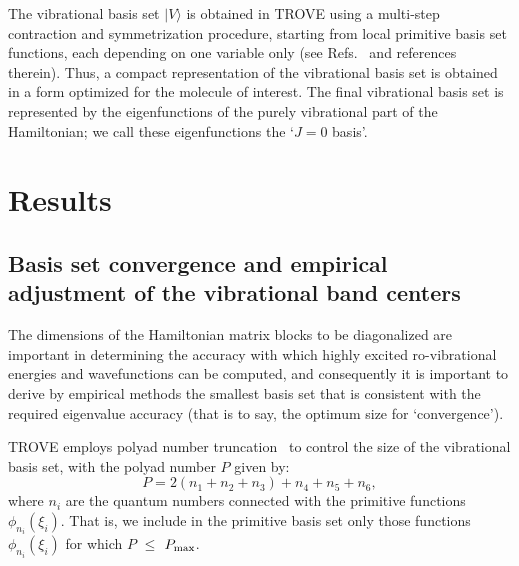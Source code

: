 \documentclass{achemso}
\newcommand{\3}{$_{3}$}
\begin{document}
The vibrational basis set $|V\rangle$ is obtained in TROVE using a multi-step contraction and symmetrization procedure, starting from local primitive basis set functions, each depending on one variable only (see Refs.~ and references therein).
Thus, a compact representation of the vibrational basis set is obtained in a form
 optimized for the molecule of interest.
 The final vibrational basis set is represented by the eigenfunctions of the purely vibrational part of the Hamiltonian;
we call these eigenfunctions the `$J=0$ basis'.

\section{Results} \label{sec:trove}

\subsection{Basis set convergence and empirical adjustment of the vibrational band centers}
\label{subs:band-centers:adjustment}
The dimensions of the Hamiltonian matrix blocks to be diagonalized
are important in determining
the accuracy with which highly excited ro-vibrational
energies and wavefunctions
 can be
computed, and consequently it is important to derive by
empirical methods the smallest basis set that is consistent
with the required eigenvalue accuracy (that is to say, the
optimum size for `convergence').

TROVE employs polyad number
truncation~\cite{trove05,trove07,trove15} to control the size
of the vibrational basis set, with the polyad number $P$ given by:
\begin{equation}\label{e:polyad-2}
P =  2 (n_1 + n_2 +n_3) + n_{4} + n_{5} + n_{6},
\end{equation}
where $n_i$ are the quantum numbers connected with the primitive
functions $\phi_{n_i}(\xi_i)$. That is, we include in the primitive basis set
 only those functions $\phi_{n_i}(\xi_i)$ for which $P$ $\leq$ $P_{\rm max}$.
\end{document}
